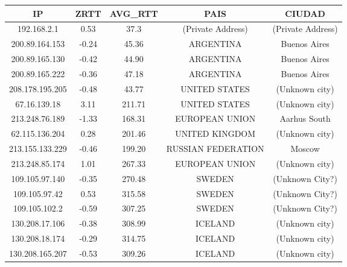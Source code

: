 \begin{tabular}{|c@{\hspace{5ex}}c@{\hspace{5ex}}c@{\hspace{5ex}}c@{\hspace{5ex}}c|}
 \hline
 \rule{0pt}{1.2em}IP & ZRTT & AVG\_RTT & PAIS & CIUDAD\\[0.2em]
 \hline

\rule{0pt}{1.2em} 192.168.2.1  &  0.53 & 37.3 & (Private Address) & (Private Address) \\[0.2em]
\rule{0pt}{1.2em} 200.89.164.153  &  -0.24 & 45.36 & ARGENTINA & Buenos Aires \\[0.2em]
\rule{0pt}{1.2em} 200.89.165.130  &  -0.42 & 44.90 & ARGENTINA & Buenos Aires \\[0.2em]
\rule{0pt}{1.2em} 200.89.165.222  &  -0.36 & 47.18 & ARGENTINA & Buenos Aires \\[0.2em]
\rule{0pt}{1.2em} 208.178.195.205  &  -0.48 & 43.77 & UNITED STATES & (Unknown city) \\[0.2em]
\rule{0pt}{1.2em} 67.16.139.18  &  3.11 & 211.71 & UNITED STATES & (Unknown city) \\[0.2em]
\rule{0pt}{1.2em} 213.248.76.189  &  -1.33 & 168.31 & EUROPEAN UNION & Aarhus South \\[0.2em]
\rule{0pt}{1.2em} 62.115.136.204  &  0.28 & 201.46 & UNITED KINGDOM & (Unknown city) \\[0.2em]
\rule{0pt}{1.2em} 213.155.133.229  &  -0.46 & 199.20 & RUSSIAN FEDERATION & Moscow \\[0.2em]
\rule{0pt}{1.2em} 213.248.85.174  &  1.01 & 267.33 & EUROPEAN UNION & (Unknown city) \\[0.2em]
\rule{0pt}{1.2em} 109.105.97.140  &  -0.35 & 270.48 & SWEDEN & (Unknown City?) \\[0.2em]
\rule{0pt}{1.2em} 109.105.97.42  &  0.53 & 315.58 & SWEDEN & (Unknown City?) \\[0.2em]
\rule{0pt}{1.2em} 109.105.102.2  &  -0.59 & 307.25 & SWEDEN & (Unknown City?) \\[0.2em]
\rule{0pt}{1.2em} 130.208.17.106  &  -0.38 & 308.99 & ICELAND & (Unknown city) \\[0.2em]
\rule{0pt}{1.2em} 130.208.18.174  &  -0.29 & 314.75 & ICELAND & (Unknown city) \\[0.2em]
\rule{0pt}{1.2em} 130.208.165.207  &  -0.53 & 309.26 & ICELAND & (Unknown city) \\[0.2em]
\hline
 \end{tabular}

